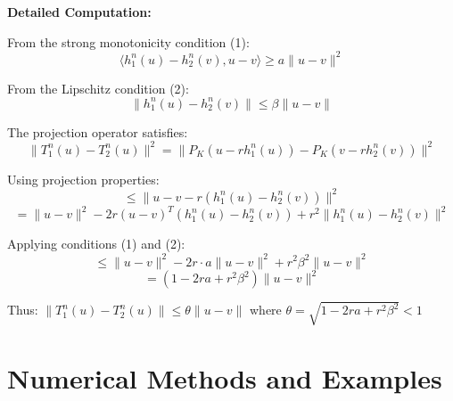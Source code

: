 \documentclass[aspectratio=169,10pt]{beamer}
\begin{document}
\begin{frame}[allowframebreaks]
\framebreak

\textbf{Detailed Computation:}

From the strong monotonicity condition (1):
$$\langle h_1^n(u) - h_2^n(v), u - v \rangle \geq a \|u - v\|^2$$

From the Lipschitz condition (2):
$$\|h_1^n(u) - h_2^n(v)\| \leq \beta \|u - v\|$$

The projection operator satisfies:
$$\|T_1^n(u) - T_2^n(u)\|^2 = \|P_K(u - r h_1^n(u)) - P_K(v - r h_2^n(v))\|^2$$

Using projection properties:
$$\leq \|u - v - r(h_1^n(u) - h_2^n(v))\|^2$$
$$= \|u - v\|^2 - 2r(u-v)^T(h_1^n(u) - h_2^n(v)) + r^2 \|h_1^n(u) - h_2^n(v)\|^2$$

Applying conditions (1) and (2):
$$\leq \|u - v\|^2 - 2r \cdot a\|u - v\|^2 + r^2 \beta^2 \|u - v\|^2$$
$$= (1 - 2ra + r^2\beta^2)\|u - v\|^2$$

Thus: $\|T_1^n(u) - T_2^n(u)\| \leq \theta \|u - v\|$ where $\theta = \sqrt{1 - 2ra + r^2\beta^2} < 1$

\end{frame}

\section{Numerical Methods and Examples}
\end{document}
